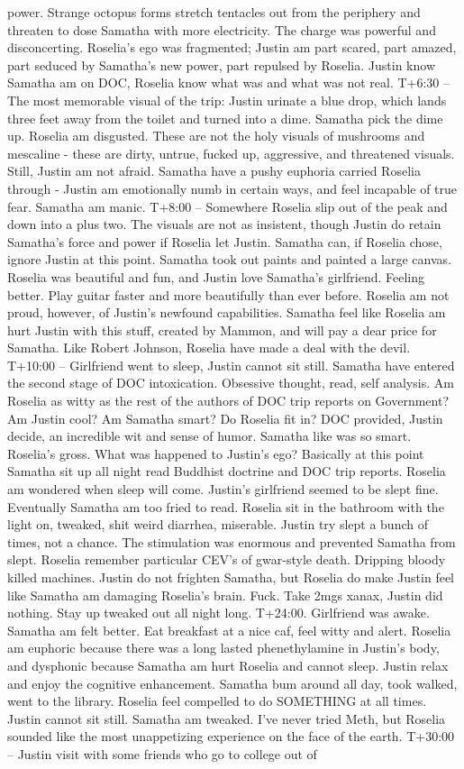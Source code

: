 \documentclass[12pt]{book}
\begin{document}
power. Strange octopus forms stretch tentacles out from the periphery and threaten to dose Samatha with more electricity. The charge was powerful and disconcerting. Roselia's ego was fragmented; Justin am part scared, part amazed, part seduced by Samatha's new power, part repulsed by Roselia. Justin know Samatha am on DOC, Roselia know what was and what was not real. T+6:30 -- The most memorable visual of the trip: Justin urinate a blue drop, which lands three feet away from the toilet and turned into a dime. Samatha pick the dime up. Roselia am disgusted. These are not the holy visuals of mushrooms and mescaline - these are dirty, untrue, fucked up, aggressive, and threatened visuals. Still, Justin am not afraid. Samatha have a pushy euphoria carried Roselia through - Justin am emotionally numb in certain ways, and feel incapable of true fear. Samatha am manic. T+8:00 -- Somewhere Roselia slip out of the peak and down into a plus two. The visuals are not as insistent, though Justin do retain Samatha's force and power if Roselia let Justin. Samatha can, if Roselia chose, ignore Justin at this point. Samatha took out paints and painted a large canvas. Roselia was beautiful and fun, and Justin love Samatha's girlfriend. Feeling better. Play guitar faster and more beautifully than ever before. Roselia am not proud, however, of Justin's newfound capabilities. Samatha feel like Roselia am hurt Justin with this stuff, created by Mammon, and will pay a dear price for Samatha. Like Robert Johnson, Roselia have made a deal with the devil. T+10:00 -- Girlfriend went to sleep, Justin cannot sit still. Samatha have entered the second stage of DOC intoxication. Obsessive thought, read, self analysis. Am Roselia as witty as the rest of the authors of DOC trip reports on Government? Am Justin cool? Am Samatha smart? Do Roselia fit in? DOC provided, Justin decide, an incredible wit and sense of humor. Samatha like was so smart. Roselia's gross. What was happened to Justin's ego? Basically at this point Samatha sit up all night read Buddhist doctrine and DOC trip reports. Roselia am wondered when sleep will come. Justin's girlfriend seemed to be slept fine. Eventually Samatha am too fried to read. Roselia sit in the bathroom with the light on, tweaked, shit weird diarrhea, miserable. Justin try slept a bunch of times, not a chance. The stimulation was enormous and prevented Samatha from slept. Roselia remember particular CEV's of gwar-style death. Dripping bloody killed machines. Justin do not frighten Samatha, but Roselia do make Justin feel like Samatha am damaging Roselia's brain. Fuck. Take 2mgs xanax, Justin did nothing. Stay up tweaked out all night long. T+24:00. Girlfriend was awake. Samatha am felt better. Eat breakfast at a nice caf, feel witty and alert. Roselia am euphoric because there was a long lasted phenethylamine in Justin's body, and dysphonic because Samatha am hurt Roselia and cannot sleep. Justin relax and enjoy the cognitive enhancement. Samatha bum around all day, took walked, went to the library. Roselia feel compelled to do SOMETHING at all times. Justin cannot sit still. Samatha am tweaked. I've never tried Meth, but Roselia sounded like the most unappetizing experience on the face of the earth. T+30:00 -- Justin visit with some friends who go to college out of 
\end{document}
